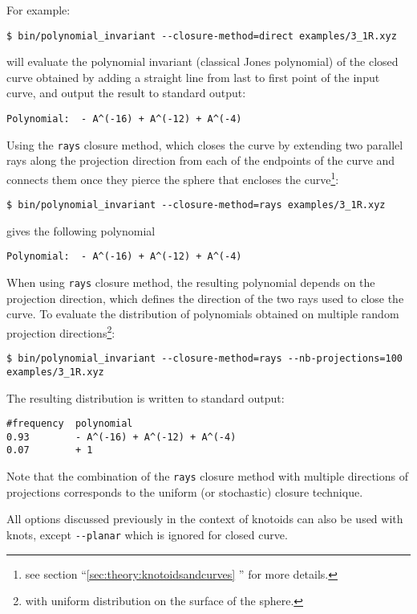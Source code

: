 For example:
\begin{lstlisting}
$ bin/polynomial_invariant --closure-method=direct examples/3_1R.xyz
\end{lstlisting}
will evaluate the polynomial invariant (classical Jones polynomial) of the closed curve obtained by adding a straight line from last to first point of the input curve, and output the result to standard output:
\begin{lstlisting}
Polynomial:  - A^(-16) + A^(-12) + A^(-4)
\end{lstlisting}
Using the \lstinline{rays} closure method, which closes the curve by extending two parallel rays along the projection direction from each of the endpoints of the curve and connects them once they pierce the sphere that encloses the curve\footnote{see section ``\ref{sec:theory:knotoidsandcurves} '' for more details.}:
\begin{lstlisting}
$ bin/polynomial_invariant --closure-method=rays examples/3_1R.xyz
\end{lstlisting}
gives the following polynomial
\begin{lstlisting}
Polynomial:  - A^(-16) + A^(-12) + A^(-4)
\end{lstlisting}
When using \lstinline{rays} closure method, the resulting polynomial depends on the projection direction, which defines the direction of the two rays used to close the curve. To evaluate the distribution of polynomials obtained on multiple random projection directions\footnote{with uniform distribution on the surface of the sphere.}:
\begin{lstlisting}
$ bin/polynomial_invariant --closure-method=rays --nb-projections=100 examples/3_1R.xyz
\end{lstlisting}
The resulting distribution is written to standard output:
\begin{lstlisting}
#frequency  polynomial
0.93        - A^(-16) + A^(-12) + A^(-4)
0.07        + 1
\end{lstlisting}
Note that the combination of the \lstinline{rays} closure method with multiple directions of projections corresponds to the uniform (or stochastic) closure technique.

All options discussed previously in the context of knotoids can also be used with knots, except \lstinline{--planar} which is ignored for closed curve.

